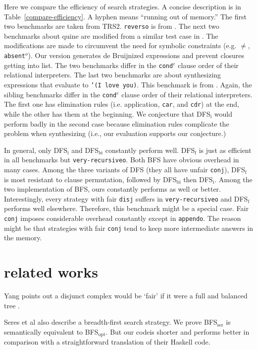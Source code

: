 \documentclass[format=acmlarge, review=true, authordraft=true]{acmart}
\newcommand{\conde}{\texttt{cond$^e$}}
\newcommand{\conj}{\texttt{conj}}
\newcommand{\disj}{\texttt{disj}}
\newcommand{\BFSopt}[0]{BFS$_\textrm{opt}$}
\newcommand{\BFSser}[0]{BFS$_\textrm{ser}$}
\begin{document}
Here we compare the efficiency of search strategies. A concise 
description is in Table~\ref{compare-efficiency}. A hyphen means ``running out of 
memory.'' The first two benchmarks are taken from 
TRS2. \texttt{reverso} is from 
\citet{rozplokhas2018improving}. The next two benchmarks 
about quine are modified from a similar test case in \citet{byrd2017unified}. 
The modifications are made 
to circumvent the need for symbolic constraints (e.g. $\neq$, 
\texttt{absent$^o$}). Our version generates de 
Bruijnized expressions and prevent closures getting into list. The two 
benchmarks differ in the \conde{} clause order of their relational 
interpreters. 
The last two 
benchmarks are about synthesizing expressions that evaluate to \texttt{'(I love 
you)}. This benchmark is from \citet{byrd2017unified}. Again, the 
sibling benchmarks differ in the \conde{} clause order of their relational 
interpreters. The first one 
has elimination rules (i.e. application, \texttt{car}, and \texttt{cdr}) at the 
end, while the other has them at the beginning. We conjecture that DFS$_\textrm{i}$ would 
perform badly in the second case because elimination rules complicate the 
problem when synthesizing (i.e., our evaluation supports our conjecture.)

In general, only DFS$_\textrm{i}$ and DFS$_\textrm{bi}$ constantly perform well. DFS$_\textrm{f}$ is just as 
efficient in all benchmarks but \texttt{very-recursiveo}. Both BFS have obvious 
overhead in many cases. Among the three variants of DFS (they all have unfair 
\conj{}), DFS$_\textrm{f}$ is most resistant to clause permutation, followed by DFS$_\textrm{bi}$ then 
DFS$_\textrm{i}$. Among the two implementation of BFS, ours constantly performs as well or 
better. Interestingly, every strategy with fair \disj{} suffers in 
\texttt{very-recursiveo} and DFS$_\textrm{f}$ performs well elsewhere. 
Therefore, this 
benchmark might be a special case. Fair \conj{} imposes considerable overhead 
constantly except in \texttt{appendo}. The reason might be that strategies with 
fair \conj{} tend to keep more intermediate answers in the memory.

\section{related works}

Yang \citet{yang2010adventures} points out a disjunct complex would be `fair' 
if it were a full and balanced tree .

Seres et al \citet{seres1999algebra} also describe a breadth-first search 
strategy. We prove \BFSser{} is semantically equivalent to \BFSopt. But our codeis shorter and performs better in comparison with a straightforward 
translation of their Haskell code.
\end{document}
